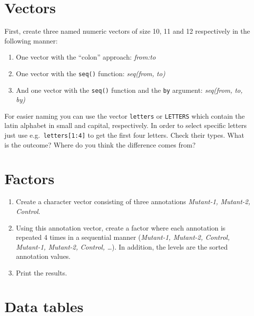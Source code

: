 \documentclass[]{article}
\author{Vangelis Theodorakis, Fatemeh Behjati, Julien Gagneur, Marcel Schulz}
\date{09 April, 2021}
\providecommand{\tightlist}{%
  \setlength{\itemsep}{0pt}\setlength{\parskip}{0pt}}
\begin{document}
\maketitle


{
\setcounter{tocdepth}{2}
\tableofcontents
\newpage
}
\hypertarget{vectors}{%
\section{Vectors}\label{vectors}}

First, create three named numeric vectors of size 10, 11 and 12 respectively in the following manner:

\begin{enumerate}
\def\labelenumi{\arabic{enumi})}
\tightlist
\item
  One vector with the ``colon'' approach: \emph{from:to}
\item
  One vector with the \texttt{seq()} function: \emph{seq(from, to)}
\item
  And one vector with the \texttt{seq()} function and the \texttt{by} argument: \emph{seq(from, to, by)}
\end{enumerate}

For easier naming you can use the vector \texttt{letters} or \texttt{LETTERS} which contain the latin alphabet in small and capital, respectively. In order to select specific letters just use e.g.~\texttt{letters{[}1:4{]}} to get the first four letters.
Check their types. What is the outcome? Where do you think the difference comes from?

\hypertarget{factors}{%
\section{Factors}\label{factors}}

\begin{enumerate}
\def\labelenumi{\arabic{enumi})}
\tightlist
\item
  Create a character vector consisting of three annotations \emph{Mutant-1, Mutant-2, Control}.
\item
  Using this annotation vector, create a factor where each annotation is repeated 4 times in a sequential manner (\emph{Mutant-1, Mutant-2, Control, Mutant-1, Mutant-2, Control, \ldots{}}). In addition, the levels are the sorted annotation values.
\item
  Print the results.
\end{enumerate}

\hypertarget{data-tables}{%
\section{Data tables}\label{data-tables}}
\end{document}
